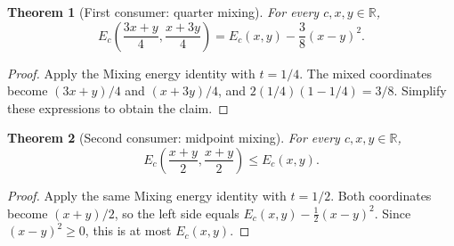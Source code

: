 \documentclass[11pt]{article}
\newtheorem{theorem}{Theorem}
\begin{document}
\begin{theorem}[First consumer: quarter mixing]\label{thm:mix-quarter-drop}
For every $c,x,y\in\mathbb{R}$,
\[
 E_c\left(\frac{3x+y}{4},\frac{x+3y}{4}\right)
 = E_c(x,y)-\frac{3}{8}(x-y)^2.
\]
\end{theorem}
\begin{proof}
Apply the Mixing energy identity with $t=1/4$.
The mixed coordinates become $(3x+y)/4$ and $(x+3y)/4$, and
$2(1/4)(1-1/4)=3/8$. Simplify these expressions to obtain the claim.
\end{proof}

\begin{theorem}[Second consumer: midpoint mixing]\label{thm:mix-half-bound}
For every $c,x,y\in\mathbb{R}$,
\[
 E_c\left(\frac{x+y}{2},\frac{x+y}{2}\right)\le E_c(x,y).
\]
\end{theorem}
\begin{proof}
Apply the same Mixing energy identity with $t=1/2$. Both coordinates
become $(x+y)/2$, so the left side equals
$E_c(x,y)-\tfrac12(x-y)^2$.
Since $(x-y)^2\ge0$, this is at most $E_c(x,y)$.
\end{proof}
\end{document}
